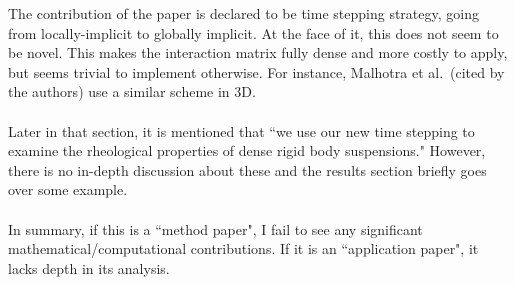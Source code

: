 \documentclass[11pt]{article}
\newcommand{\comment}[1]{{\color{blue} #1}}
\begin{document}
\noindent
\comment{The contribution of the paper is declared to be time stepping
strategy, going from locally-implicit to globally implicit. At the face
of it, this does not seem to be novel. This makes the interaction matrix
fully dense and more costly to apply, but seems trivial to implement
otherwise. For instance, Malhotra et al.~(cited by the authors) use a
similar scheme in 3D.
\\ \\ \noindent
Later in that section, it is mentioned that ``we use our new time
stepping to examine the rheological properties of dense rigid body
suspensions." However, there is no in-depth discussion about these and
the results section briefly goes over some example.
\\ \\ \noindent
In summary, if this is a ``method paper", I fail to see any significant
mathematical/computational contributions. If it is an ``application
paper", it lacks depth in its analysis.}
\end{document}
